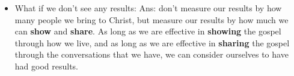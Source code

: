\begin{itemize}
{\begin{itemize}
    \item{What if we don't see any results: Ans: don't measure our results by
    how many people we bring to Christ, but measure our results by how much
    we can \textbf{show} and \textbf{share}.  As long as we are effective in
    \textbf{showing} the gospel through how we live, and as long as we are
    effective in \textbf{sharing} the gospel through the conversations that
    we have, we can consider ourselves to have had good results.}
  \end{itemize}}
\end{itemize}